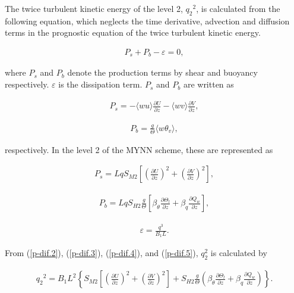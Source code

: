 The twice turbulent kinetic energy of the level 2, \({q_2}^2\), is calculated from the following equation, which neglects the time derivative, advection and diffusion terms in the prognostic equation
of the twice turbulent kinetic energy.

\begin{eqnarray} P_s + P_b - \varepsilon = 0 \label{p-dif.2}, \end{eqnarray}

where \(P_s\) and \(P_b\) denote the production terms by shear and buoyancy respectively. \(\varepsilon\) is the dissipation term. \(P_s\) and \(P_b\) are written as

\begin{eqnarray} P_s = -\langle wu \rangle \frac{\partial U}{\partial z} - \langle wv \rangle \frac{\partial V}{\partial z}, \end{eqnarray}

\begin{eqnarray} P_b = \frac{g}{\Theta}\langle w\theta_v \rangle, \end{eqnarray}

respectively. In the level 2 of the MYNN scheme, these are represented as

\begin{eqnarray} P_s = LqS_{M2} \left[ \left(\frac{\partial U}{\partial z}\right)^2 + \left(\frac{\partial V}{\partial z}\right)^2 \right] \label{p-dif.3}, \end{eqnarray}

\begin{eqnarray} P_b = LqS_{H2} \frac{g}{\Theta}\left[ \beta_\theta \frac{\partial \Theta_l}{\partial z} + \beta_q \frac{\partial Q_w}{\partial z} \right] \label{p-dif.4}, \end{eqnarray}

\begin{eqnarray} \varepsilon = \frac{q^3}{B_1 L} \label{p-dif.5}. \end{eqnarray}

From (\ref{p-dif.2}), (\ref{p-dif.3}), (\ref{p-dif.4}), and (\ref{p-dif.5}), \(q_2^2\) is calculated by

\begin{eqnarray}{q_2}^2=B_1L^2\left\{S_{M2}\left[\left(\frac{\partial U}{\partial z}\right)^2+\left(\frac{\partial V}{\partial z}\right)^2\right]+S_{H2}\frac{g}{\Theta}\left(\beta_\theta \frac{\partial \Theta_l}{\partial z}+\beta_q \frac{\partial Q_w}{\partial z}\right)\right\}.\end{eqnarray}

